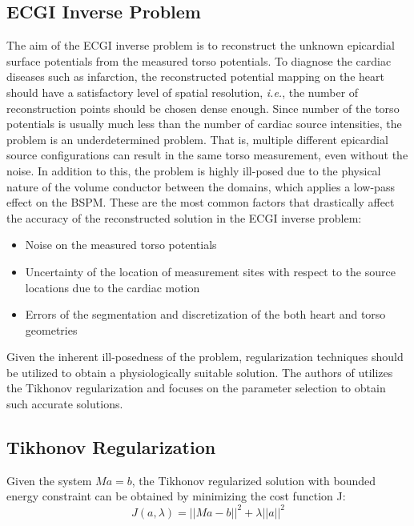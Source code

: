 \documentclass[draftcls, onecolumn, journal]{IEEEtran}
\begin{document}
\subsection{ECGI Inverse Problem}\label{subsec:ecginv}

The aim of the ECGI inverse problem is to reconstruct the unknown epicardial surface potentials from the measured torso potentials. To diagnose the cardiac diseases such as infarction, the reconstructed potential mapping on the heart should have a satisfactory level of spatial resolution, \textit{i.e.}, the number of reconstruction points should be chosen dense enough. Since number of the torso potentials is usually much less than the number of cardiac source intensities, the problem is an underdetermined problem. That is, multiple different epicardial source configurations can result in the same torso measurement, even without the noise. In addition to this, the problem is highly ill-posed due to the physical nature of the volume conductor between the domains, which applies a low-pass effect on the BSPM. These are the most common factors that drastically affect the accuracy of the reconstructed solution in the ECGI inverse problem:

\begin{itemize}
    \item Noise on the measured torso potentials
    \item Uncertainty of the location of measurement sites with respect to the source locations due to the cardiac motion 
    \item Errors of the segmentation and discretization of the both heart and torso geometries
\end{itemize}

Given the inherent ill-posedness of the problem, regularization techniques should be utilized to obtain a physiologically suitable solution. The authors of \cite*{chamorro2017improving} utilizes the Tikhonov regularization and focuses on the parameter selection to obtain such accurate solutions. 

\subsection{Tikhonov Regularization}\label{subsec:tikreg}

Given the system $Ma = b$, the Tikhonov regularized solution with bounded energy constraint can be obtained by minimizing the cost function J:
\begin{equation}
    J(a,\lambda) = ||Ma-b||^2 + \lambda ||a||^2
\end{equation}
\end{document}
